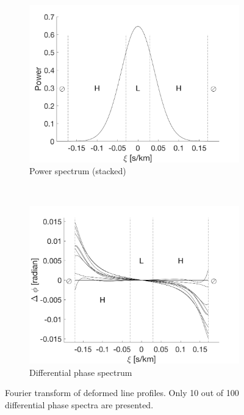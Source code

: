 \begin{figure}[tbp]	
    \begin{subfigure}[b]{0.49\textwidth}
        \includegraphics[width=\textwidth]{./Figures/Methods/LPD2-FT_power.png}
        \caption{Power spectrum (stacked)}
    \end{subfigure}
	~
    \begin{subfigure}[b]{0.49\textwidth}
        \includegraphics[width=\textwidth]{./Figures/Methods/LPD4-Relative_phase_angle.png}
        \caption{Differential phase spectrum}
        \label{fig:dps_LPD}
    \end{subfigure}
    
    \caption[Fourier transform of deformed line profiles]
    {Fourier transform of deformed line profiles. Only 10 out of 100 differential phase spectra are presented.}
\label{fig:FT_process_LPD}
\end{figure}    


